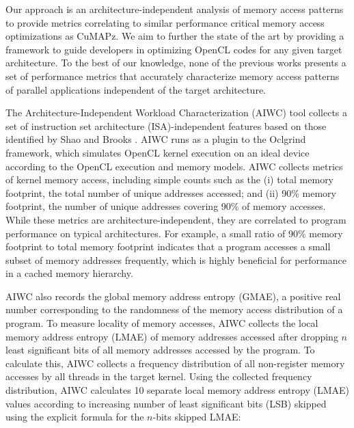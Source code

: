 \documentclass[review=false, sigchi]{acmart}
\begin{document}
	Our approach is an architecture-independent analysis of memory access patterns to provide metrics correlating to similar performance critical memory access optimizations as CuMAPz.
	We aim to further the state of the art by providing a framework to guide developers in optimizing OpenCL codes for any given target architecture.
	To the best of our knowledge, none of the previous works presents a set of performance metrics that accurately characterize memory access patterns of parallel applications independent of the target architecture.
	
	The Architecture-Independent Workload Characterization (AIWC) tool \cite{beauaiwc} collects a set of instruction set architecture (ISA)-independent features based on those identified by Shao and Brooks \cite{shao2013isa}.
	AIWC runs as a plugin to the Oclgrind~\cite{price:15} framework, which simulates OpenCL kernel execution on an ideal device according to the OpenCL execution and memory models.
	AIWC collects metrics of kernel memory access, including simple counts such as the (i) total memory footprint, the total number of unique addresses accessed; and (ii) 90\% memory footprint, the number of unique addresses covering 90\% of memory accesses.
	While these metrics are architecture-independent, they are correlated to program performance on typical architectures.
	For example, a small ratio of 90\% memory footprint to total memory footprint indicates that a program accesses a small subset of memory addresses frequently, which is highly beneficial for performance in a cached memory hierarchy.
	
	AIWC also records the global memory address entropy (GMAE), a positive real number corresponding to the randomness of the memory access distribution of a program. To measure locality of memory accesses, AIWC collects the local memory address entropy (LMAE) of memory addresses accessed after dropping $n$ least significant bits of all memory addresses accessed by the program. To calculate this, AIWC collects a frequency distribution of all non-register memory accesses by all threads in the target kernel. Using the collected frequency distribution, AIWC calculates 10 separate local memory address entropy (LMAE) values according to increasing number of least significant bits (LSB) skipped using
	the explicit formula for the $n$-bits skipped LMAE:
	
\end{document}
